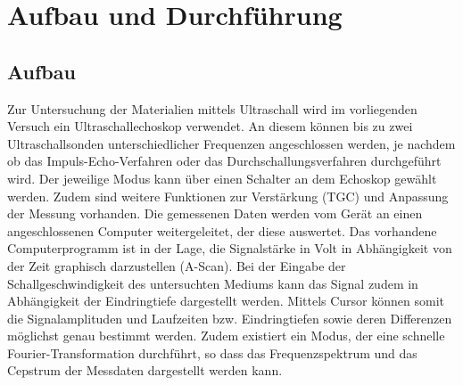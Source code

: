 \section{Aufbau und Durchführung}
\subsection{Aufbau}
\label{sec:Aufbau}
Zur Untersuchung der Materialien mittels Ultraschall wird im vorliegenden Versuch ein Ultraschallechoskop verwendet.
An diesem können bis zu zwei Ultraschallsonden unterschiedlicher Frequenzen angeschlossen werden, je nachdem ob das Impuls-Echo-Verfahren oder das Durchschallungsverfahren durchgeführt wird.
Der jeweilige Modus kann über einen Schalter an dem Echoskop gewählt werden.
Zudem sind weitere Funktionen zur Verstärkung (TGC) und Anpassung der Messung vorhanden.
Die gemessenen Daten werden vom Gerät an einen angeschlossenen Computer weitergeleitet, der diese auswertet.
Das vorhandene Computerprogramm ist in der Lage, die Signalstärke in Volt in Abhängigkeit von der Zeit graphisch darzustellen (A-Scan).
Bei der Eingabe der Schallgeschwindigkeit des untersuchten Mediums kann das Signal zudem in Abhängigkeit der Eindringtiefe dargestellt werden.
Mittels Cursor können somit die Signalamplituden und Laufzeiten bzw. Eindringtiefen sowie deren Differenzen möglichst genau bestimmt werden.
Zudem existiert ein Modus, der eine schnelle Fourier-Transformation durchführt, so dass das Frequenzspektrum und das Cepstrum der Messdaten dargestellt werden kann.
